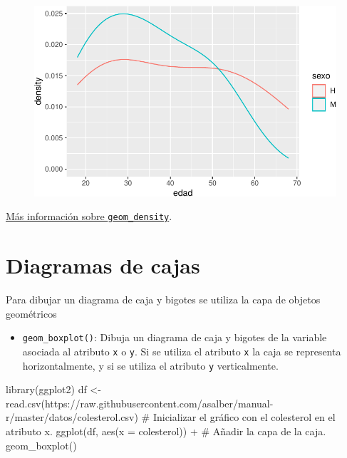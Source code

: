 \documentclass[
  a4paper,
]{scrreport}
\newenvironment{Shaded}{\begin{snugshade}}{\end{snugshade}}
\newcommand{\AttributeTok}[1]{\textcolor[rgb]{0.40,0.45,0.13}{#1}}
\newcommand{\CommentTok}[1]{\textcolor[rgb]{0.37,0.37,0.37}{#1}}
\newcommand{\FunctionTok}[1]{\textcolor[rgb]{0.28,0.35,0.67}{#1}}
\newcommand{\NormalTok}[1]{\textcolor[rgb]{0.00,0.23,0.31}{#1}}
\newcommand{\OtherTok}[1]{\textcolor[rgb]{0.00,0.23,0.31}{#1}}
\newcommand{\SpecialCharTok}[1]{\textcolor[rgb]{0.37,0.37,0.37}{#1}}
\newcommand{\StringTok}[1]{\textcolor[rgb]{0.13,0.47,0.30}{#1}}
\providecommand{\tightlist}{%
  \setlength{\itemsep}{0pt}\setlength{\parskip}{0pt}}\usepackage{longtable,booktabs,array}
\theoremstyle{definition}
\theoremstyle{definition}
\theoremstyle{remark}
\begin{document}
\begin{figure}[H]

{\centering \includegraphics{./07-graficos_files/figure-pdf/unnamed-chunk-20-1.pdf}

}

\end{figure}

\href{https://ggplot2.tidyverse.org/reference/geom_density.html}{Más
información sobre \texttt{geom\_density}}.

\hypertarget{diagramas-de-cajas}{%
\section{Diagramas de cajas}\label{diagramas-de-cajas}}

Para dibujar un diagrama de caja y bigotes se utiliza la capa de objetos
geométricos

\begin{itemize}
\tightlist
\item
  \texttt{geom\_boxplot()}: Dibuja un diagrama de caja y bigotes de la
  variable asociada al atributo \texttt{x} o \texttt{y}. Si se utiliza
  el atributo \texttt{x} la caja se representa horizontalmente, y si se
  utiliza el atributo \texttt{y} verticalmente.
\end{itemize}

\begin{Shaded}
\begin{Highlighting}[]
\FunctionTok{library}\NormalTok{(ggplot2)}
\NormalTok{df }\OtherTok{\textless{}{-}} \FunctionTok{read.csv}\NormalTok{(}\StringTok{\textquotesingle{}https://raw.githubusercontent.com/asalber/manual{-}r/master/datos/colesterol.csv\textquotesingle{}}\NormalTok{)}
\CommentTok{\# Inicializar el gráfico con el colesterol en el atributo x.}
\FunctionTok{ggplot}\NormalTok{(df, }\FunctionTok{aes}\NormalTok{(}\AttributeTok{x =}\NormalTok{ colesterol)) }\SpecialCharTok{+}
\CommentTok{\# Añadir la capa de la caja.}
    \FunctionTok{geom\_boxplot}\NormalTok{()}
\end{Highlighting}
\end{Shaded}
\end{document}
